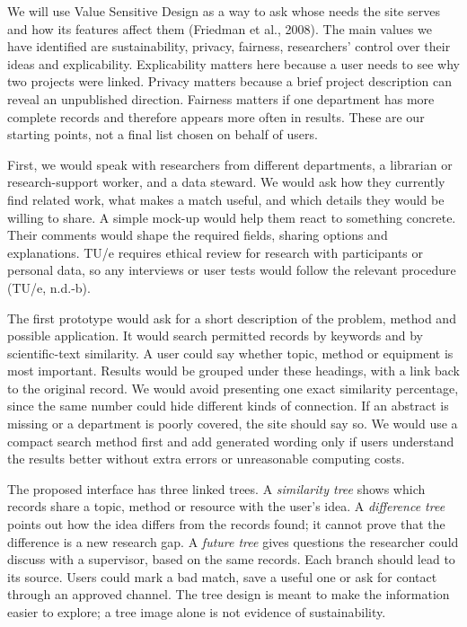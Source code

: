 \documentclass[11pt,a4paper]{article}
\begin{document}
We will use Value Sensitive Design as a way to ask whose needs the site serves and how its features affect them (Friedman et al., 2008). The main values we have identified are sustainability, privacy, fairness, researchers' control over their ideas and explicability. Explicability matters here because a user needs to see why two projects were linked. Privacy matters because a brief project description can reveal an unpublished direction. Fairness matters if one department has more complete records and therefore appears more often in results. These are our starting points, not a final list chosen on behalf of users.

First, we would speak with researchers from different departments, a librarian or research-support worker, and a data steward. We would ask how they currently find related work, what makes a match useful, and which details they would be willing to share. A simple mock-up would help them react to something concrete. Their comments would shape the required fields, sharing options and explanations. TU/e requires ethical review for research with participants or personal data, so any interviews or user tests would follow the relevant procedure (TU/e, n.d.-b).

The first prototype would ask for a short description of the problem, method and possible application. It would search permitted records by keywords and by scientific-text similarity. A user could say whether topic, method or equipment is most important. Results would be grouped under these headings, with a link back to the original record. We would avoid presenting one exact similarity percentage, since the same number could hide different kinds of connection. If an abstract is missing or a department is poorly covered, the site should say so. We would use a compact search method first and add generated wording only if users understand the results better without extra errors or unreasonable computing costs.

The proposed interface has three linked trees. A \emph{similarity tree} shows which records share a topic, method or resource with the user's idea. A \emph{difference tree} points out how the idea differs from the records found; it cannot prove that the difference is a new research gap. A \emph{future tree} gives questions the researcher could discuss with a supervisor, based on the same records. Each branch should lead to its source. Users could mark a bad match, save a useful one or ask for contact through an approved channel. The tree design is meant to make the information easier to explore; a tree image alone is not evidence of sustainability.
\end{document}

